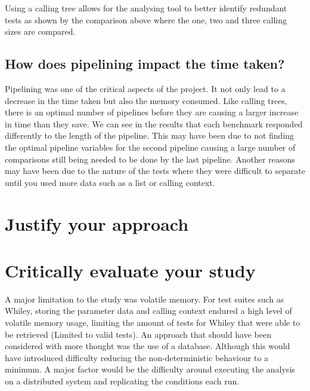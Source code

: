 Using a calling tree allows for the analysing tool to better identify redundant tests as shown by the comparison above where the one, two and three calling sizes are compared.

\subsection{How does pipelining impact the time taken?}

Pipelining was one of the critical aspects of the project. It not only lead to a decrease in the time taken but also the memory consumed. Like calling trees, there is an optimal number of pipelines before they are causing a larger increase in time than they save. We can see in the results that each  benchmark responded differently to the length of the pipeline. This may have been due to not finding the optimal pipeline variables for the second pipeline causing a large number of comparisons still being needed to be done by the last pipeline. Another reasons may have been due to the nature of the tests where they were difficult to separate until you used more data such as a list or calling context. 


\section{Justify your approach}



\section{Critically evaluate your study}
\label{sec:crit}
A major limitation to the study was volatile memory. For test suites such as Whiley, storing the parameter data and calling context endured a high level of volatile memory usage, limiting the amount of tests for Whiley that were able to be retrieved (Limited to valid tests). An approach that should have been considered with more thought was the use of a database. Although this would have introduced difficulty reducing the non-deterministic behaviour to a minimum. A major factor would be the difficulty around executing the analysis on a distributed system and replicating the conditions each run.

